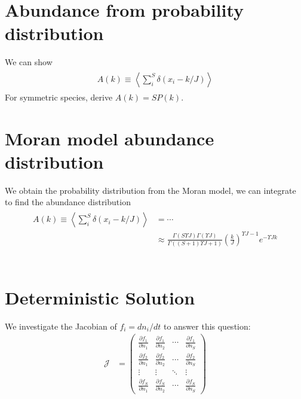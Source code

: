 \documentclass[11pt,a4paper,final]{iopart}
\begin{document}
\begin{appendices}
\section{Abundance from probability distribution}
\label{prob-abund}
We can show
\begin{align}
\begin{split}
A(k) \equiv \left\langle \sum_i^S \delta(x_i-k/J) \right\rangle
\end{split}
\end{align}
For symmetric species, derive $A(k)=SP(k)$.

\section{Moran model abundance distribution}\label{antonderiv}
We obtain the probability distribution from the Moran model, we can integrate to find the abundance distribution
\begin{align}
\begin{split}
A(k) \equiv \left\langle \sum_i^S \delta(x_i-k/J) \right\rangle &= \cdots \\
&\approx \frac{\Gamma (S \Upsilon J) \Gamma (\Upsilon J)}{\Gamma ((S+1)\Upsilon J + 1)}\left(\frac{k}{J}\right)^{\Upsilon J - 1} e^{-\Upsilon J k}
\end{split}
\end{align}
\\
\section{Deterministic Solution}
We investigate the Jacobian of $f_i=dn_i/dt$ to answer this question:
\begin{align*}
\mathcal{J} &=
\begin{pmatrix}
\frac{\partial f_1}{\partial n_1} & \frac{\partial f_1}{\partial n_2} & \cdots & \frac{\partial f_1}{\partial n_S} \\
\frac{\partial f_2}{\partial n_1} & \frac{\partial f_2}{\partial n_2} & \cdots & \frac{\partial f_2}{\partial n_S} \\
\vdots & \vdots & \ddots & \vdots \\
\frac{\partial f_S}{\partial n_1} & \frac{\partial f_S}{\partial n_2} & \cdots & \frac{\partial f_S}{\partial n_S}
\end{pmatrix} 
\end{align*}
\end{appendices}
\end{document}
